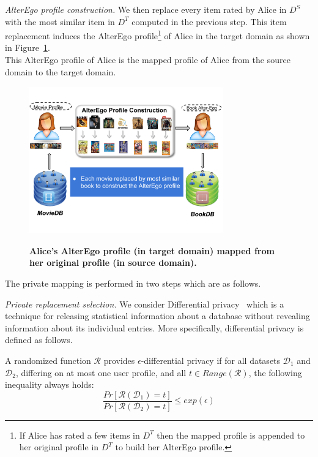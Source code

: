 {\it AlterEgo profile construction.} We then replace every item rated by Alice in $D^S$ with the most similar item in $D^T$ computed in the previous step. This item replacement induces the AlterEgo profile\footnote{If Alice has rated a few items in $D^T$ then the mapped profile is appended to her original profile in $D^T$ to build her AlterEgo profile.} of Alice in the target domain as shown in Figure~\ref{fig:alterego}.\\
This AlterEgo profile of Alice is the mapped profile of Alice from the source domain to the target domain.
\begin{figure}[!htb]
\begin{center}
\vspace{-7mm}
\includegraphics[height=2.5in,width=3.3in]{figures/AlterEgo.png}
\vspace{-12mm}
\caption{{\bf Alice's AlterEgo profile (in target domain) mapped from her original profile (in source domain).}}
\vspace{-2mm}
\label{fig:alterego}
\end{center}
\end{figure}


 The private mapping is performed in two steps which are as follows.

{\it Private replacement selection.} We consider Differential privacy~\cite{dwork2006calibrating} which is a technique for releasing statistical information about a database without revealing information about its individual entries. More specifically, differential privacy is defined as follows.


\begin{definition}
A randomized function $\mathcal{R}$ provides $\epsilon$-differential privacy if for all datasets $\mathcal{D}_1$ and $\mathcal{D}_2$, differing on at most one user profile, and all $t \in Range(\mathcal{R})$, the following inequality always holds:
$$\frac{Pr[\mathcal{R}(\mathcal{D}_{1} ) = t]}{Pr[\mathcal{R}(\mathcal{D}_{2}) = t]} \le exp(\epsilon)$$
\end{definition}


